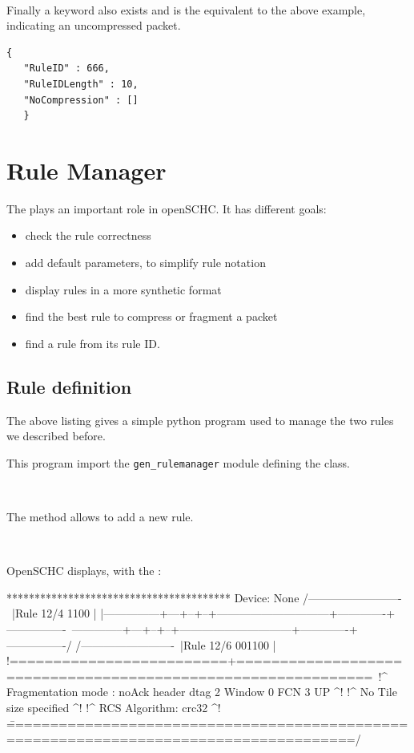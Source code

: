 ~

Finally a  keyword also exists and is the equivalent to the above example, indicating an uncompressed packet.

\begin{lstlisting}[backgroundcolor=\color{yellow}]
   {
   "RuleID" : 666,
   "RuleIDLength" : 10,
   "NoCompression" : []
   }
\end{lstlisting}


\section{Rule Manager}

The  plays an important role in openSCHC. It has different goals:
\begin{itemize}
    \item check the rule correctness
    \item add default parameters, to simplify rule notation
    \item display rules in a more synthetic format
    \item find the best rule to compress or fragment a packet
    \item find a rule from its rule ID.
\end{itemize}

\subsection{Rule definition}

The above listing gives a simple python program used to manage the two rules we described before. 


This program import the \texttt{gen\_rulemanager} module defining the \texttt{} class. 

~~


The \texttt{} method allows to add a new rule.

~~~

OpenSCHC displays, with the :

\begin{termc}[backgroundcolor=\color{palerod}, basicstyle=\ttfamily\tiny, escapechar=@]
****************************************
Device: None
/-------------------------\
|Rule 12/4          1100  |
|---------------+---+--+--+------------------------------+-------------+----------------\
\---------------+---+--+--+------------------------------+-------------+----------------/
/-------------------------\
|Rule 12/6        001100  |
!=========================+=============================================================\
!^ Fragmentation mode : noAck    header dtag 2 Window  0 FCN  3                     UP ^!
!^ No Tile size specified                                                              ^!
!^ RCS Algorithm: crc32                                                                ^!
\=======================================================================================/
\end{termc}

